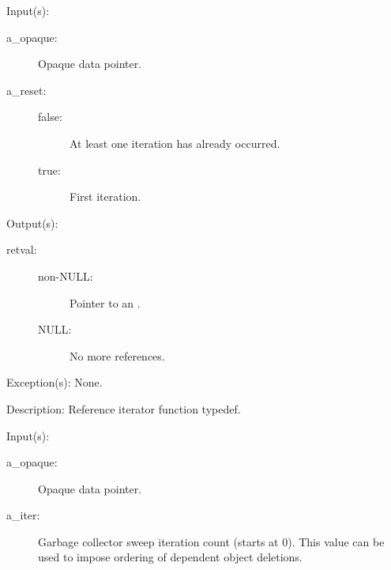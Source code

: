 \begin{capi}
\label{cw_nxo_instance_ref_iter_t}
	\begin{capilist}
	\item[Input(s): ]
		\begin{description}\item[]
		\item[a\_opaque: ]
			Opaque data pointer.
		\item[a\_reset: ]
			\begin{description}\item[]
			\item[false: ]
				At least one iteration has already occurred.
			\item[true: ]
				First iteration.
			\end{description}
		\end{description}
	\item[Output(s): ]
		\begin{description}\item[]
		\item[retval: ]
			\begin{description}\item[]
			\item[non-NULL: ]
				Pointer to an .
			\item[NULL: ]
				No more references.
			\end{description}
		\end{description}
	\item[Exception(s): ] None.
	\item[Description: ]
		Reference iterator function typedef.
	\end{capilist}
\label{cw_nxo_instance_delete_t}
	\begin{capilist}
	\item[Input(s): ]
		\begin{description}\item[]
		\item[a\_opaque: ]
			Opaque data pointer.
		\item[a\_iter: ]
			Garbage collector sweep iteration count (starts at 0).
			This value can be used to impose ordering of dependent
			object deletions.

\end{description}
\end{capilist}
\end{capi}
